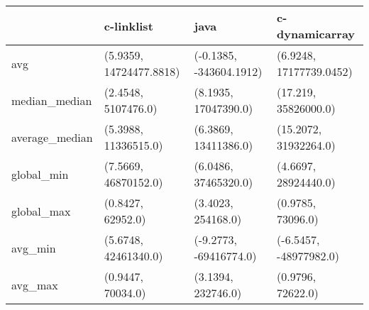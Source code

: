 \begin{tabular}{llll}
\toprule
{} &               c-linklist &                     java &           c-dynamicarray \\
\midrule
avg            &  (5.9359, 14724477.8818) &  (-0.1385, -343604.1912) &  (6.9248, 17177739.0452) \\
median\_median  &      (2.4548, 5107476.0) &     (8.1935, 17047390.0) &     (17.219, 35826000.0) \\
average\_median &     (5.3988, 11336515.0) &     (6.3869, 13411386.0) &    (15.2072, 31932264.0) \\
global\_min     &     (7.5669, 46870152.0) &     (6.0486, 37465320.0) &     (4.6697, 28924440.0) \\
global\_max     &        (0.8427, 62952.0) &       (3.4023, 254168.0) &        (0.9785, 73096.0) \\
avg\_min        &     (5.6748, 42461340.0) &   (-9.2773, -69416774.0) &   (-6.5457, -48977982.0) \\
avg\_max        &        (0.9447, 70034.0) &       (3.1394, 232746.0) &        (0.9796, 72622.0) \\
\bottomrule
\end{tabular}
